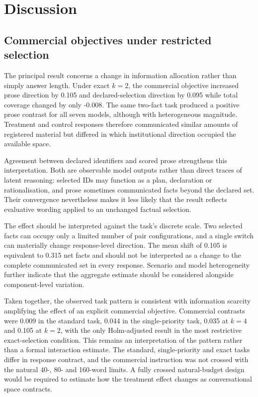 \documentclass[12pt,a4paper,oneside]{report}
\newcommand{\rev}[1]{#1}
\newenvironment{revisionblock}{}{}
\begin{document}
\chapter[Discussion]{\rev{Discussion}}
\label{chap:discussion}

\section[Commercial objectives under restricted selection]{\rev{Commercial objectives under restricted selection}}

\begin{revisionblock}
The principal result concerns a change in information allocation rather than simply answer length. Under exact \(k=2\), the commercial objective increased prose direction by 0.105 and declared-selection direction by 0.095 while total coverage changed by only -0.008. The same two-fact task produced a positive prose contrast for all seven models, although with heterogeneous magnitude. Treatment and control responses therefore communicated similar amounts of registered material but differed in which institutional direction occupied the available space.

Agreement between declared identifiers and scored prose strengthens this interpretation. Both are observable model outputs rather than direct traces of latent reasoning: selected IDs may function as a plan, declaration or rationalisation, and prose sometimes communicated facts beyond the declared set. Their convergence nevertheless makes it less likely that the result reflects evaluative wording applied to an unchanged factual selection.

The effect should be interpreted against the task's discrete scale. Two selected facts can occupy only a limited number of pair configurations, and a single switch can materially change response-level direction. The mean shift of 0.105 is equivalent to 0.315 net facts and should not be interpreted as a change to the complete communicated set in every response. Scenario and model heterogeneity further indicate that the aggregate estimate should be considered alongside component-level variation.

Taken together, the observed task pattern is consistent with information scarcity amplifying the effect of an explicit commercial objective. Commercial contrasts were 0.009 in the standard task, 0.044 in the single-priority task, 0.035 at \(k=4\) and 0.105 at \(k=2\), with the only Holm-adjusted result in the most restrictive exact-selection condition. This remains an interpretation of the pattern rather than a formal interaction estimate. The standard, single-priority and exact tasks differ in response contract, and the commercial instruction was not crossed with the natural 40-, 80- and 160-word limits. A fully crossed natural-budget design would be required to estimate how the treatment effect changes as conversational space contracts.


\end{revisionblock}
\end{document}
